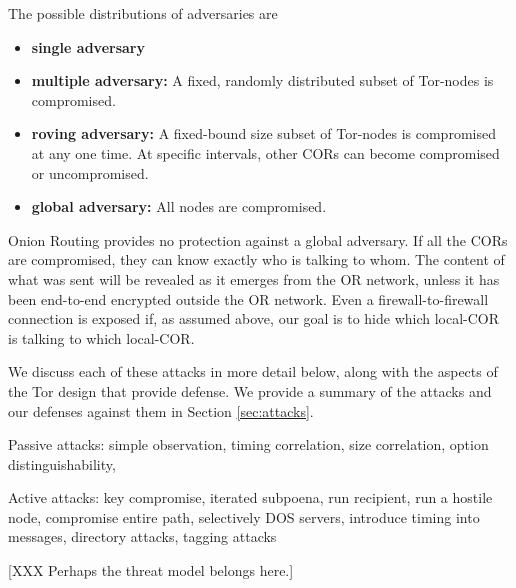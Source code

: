 \documentclass[times,10pt,twocolumn]{article}
\begin{document}
The possible distributions of adversaries are
\begin{itemize}
\item{\bf single adversary}
\item{\bf multiple adversary:} A fixed, randomly distributed subset of
  Tor-nodes is compromised.
\item{\bf roving adversary:} A fixed-bound size subset of Tor-nodes is
  compromised at any one time. At specific intervals, other CORs can
  become compromised or uncompromised.
\item{\bf global adversary:} All nodes are compromised.
\end{itemize}

Onion Routing provides no protection against a global adversary.  If
all the CORs are compromised, they can know exactly who is talking to
whom. The content of what was sent will be revealed as it emerges
from the OR network, unless it has been end-to-end encrypted outside the
OR network. Even a firewall-to-firewall connection is exposed
if, as assumed above, our goal is to hide which local-COR is talking to
which local-COR.



\label{subsec:known-attacks}

We discuss each of these attacks in more detail below, along with the
aspects of the Tor design that provide defense. We provide a summary
of the attacks and our defenses against them in Section \ref{sec:attacks}.

Passive attacks:
simple observation,
timing correlation,
size correlation,
option distinguishability,

Active attacks:
key compromise,
iterated subpoena,
run recipient,
run a hostile node,
compromise entire path,
selectively DOS servers,
introduce timing into messages,
directory attacks,
tagging attacks

\label{sec:assumptions}

[XXX Perhaps the threat model belongs here.]


\label{sec:design}



\label{subsec:exitpolicies}

\label{subsec:dir-servers}
\end{document}
